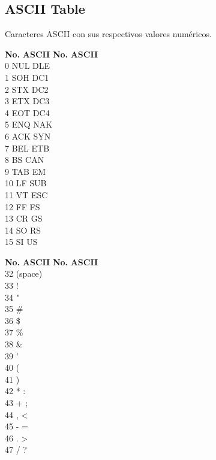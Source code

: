 \documentclass[10pt,landscape,twocolumn,a4paper,notitlepage]{article}
\begin{document}
\subsection{ASCII Table}
Caracteres ASCII con sus respectivos valores numéricos.


\begin{tabbing}
\textbf{No.}\hspace{1cm} \=  \textbf{ASCII}\hspace{2cm} \= \textbf{No.}\hspace{1cm} \= \textbf{ASCII}\hspace{2cm}  \\ 
0 \> NUL  \> DLE \\
1 \> SOH  \> DC1 \\
2 \> STX  \> DC2 \\
3 \> ETX  \> DC3 \\
4 \> EOT  \> DC4 \\
5 \> ENQ  \> NAK \\
6 \> ACK  \> SYN \\
7 \> BEL  \> ETB \\
8 \> BS  \> CAN \\
9 \> TAB  \> EM \\
10 \> LF  \> SUB \\
11 \> VT  \> ESC \\
12 \> FF  \> FS \\
13 \> CR  \> GS \\
14 \> SO  \> RS \\
15 \> SI  \> US \\ 
\end{tabbing}


\begin{tabbing}
\textbf{No.}\hspace{1cm} \=  \textbf{ASCII}\hspace{2cm} \= \textbf{No.}\hspace{1cm} \= \textbf{ASCII}\hspace{2cm}  \\ 
32 \> (space)   \\
33 \> !   \\
34 \> "   \\
35 \> \#   \\
36 \> \$   \\
37 \> \%   \\
38 \> \&   \\
39 \> '   \\
40 \> (   \\
41 \> )   \\
42 \> *  \> : \\
43 \> +  \> ; \\
44 \> ,  \> < \\
45 \> -  \> = \\
46 \> .  \> > \\
47 \> /  \> ? \\ 
\end{tabbing}
\end{document}
